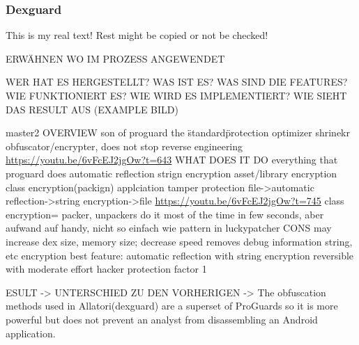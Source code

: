 \subsubsection{Dexguard} \label{subsubsection:counter-reengineering-optobf-dexguard}
This is my real text! Rest might be copied or not be checked!

ERWÄHNEN WO IM PROZESS ANGEWENDET\newline


WER HAT ES HERGESTELLT? WAS IST ES? WAS SIND DIE FEATURES? WIE FUNKTIONIERT ES? WIE WIRD ES IMPLEMENTIERT? WIE SIEHT DAS RESULT AUS (EXAMPLE BILD)\newline

master2\newline
OVERVIEW\newline
son of proguard\newline
the \"standard\" protection\newline
optimizer\newline
shrinekr\newline
obfuscator/encrypter, does not stop reverse engineering\newline
\url{https://youtu.be/6vFcEJ2jgOw?t=643}\newline
WHAT DOES IT DO\newline
everything that proguard does\newline
automatic reflection\newline
strign encryption\newline
asset/library encryption\newline
class encryption(packign)\newline
applciation tamper protection\newline
file->automatic reflection->string encryption->file\newline
\url{https://youtu.be/6vFcEJ2jgOw?t=745}\newline
class encryption= packer, unpackers do it most of the time in few seconds, aber aufwand auf handy, nicht so einfach wie pattern in luckypatcher\newline
CONS\newline
may increase dex size, memory size; decrease speed\newline
removes debug information\newline
string, etc encryption\newline
best feature: automatic reflection with string encryption\newline
reversible with moderate effort\newline
hacker protection factor 1\newline

ESULT -> UNTERSCHIED ZU DEN VORHERIGEN -> The obfuscation methods used in Allatori(dexguard) are a superset of ProGuards so it is more powerful but does not prevent an analyst from disassembling an Android application.
